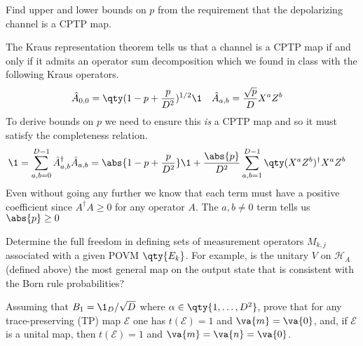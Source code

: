 \documentclass[
	pages,
	boxes,
	color=RoyalPurple
]{homework}
\makeatletter
\numberwithin{tcb@cnt@prob}{section}
\makeatother
\begin{document}
\begin{problem}
Find upper and lower bounds on $p$ from the requirement that the depolarizing channel is a CPTP map.
\end{problem}

\begin{solution}
    The Kraus representation theorem tells us that a channel is a CPTP map if and only if it admits an operator sum decomposition which we found in class with the following Kraus operators.
    \begin{align*}
        \hat{A}_{0,0} & = \qty(1 - p + \frac{p}{D^2})^{1/2}\1 & \hat{A}_{a,b} & = \frac{\sqrt{p}}{D}X^a Z^b
    \end{align*}
    To derive bounds on $p$ we need to ensure this \emph{is} a CPTP map and so it must satisfy the completeness relation.
    \begin{align*}
        \1  = \sum_{a, b = 0}^{D-1}\hat{A}_{a,b}^\dagger\hat{A}_{a,b} & = \abs{1 - p + \frac{p  }{D^2}} \1 + \frac{\abs{p}}{D^2}\sum_{a, b = 1}^{D-1}\qty(X^a Z^b)^\dagger X^a Z^b %
    \end{align*}
    Even without going any further we know that each term must have a positive coefficient since $A^\dagger A \geq 0$ for any operator $A$. The $a, b \neq 0$ term tells us $\abs{p} \geq 0$

\end{solution}

\setcounter{section}{12}
\begin{problem}
Determine the full freedom in defining sets of measurement operators $M_{k,j}$ associated with a given POVM $\qty{E_k}$. For example, is the unitary $V$ on $\mathcal{H}_A$ (defined above) the most general map on the output state that is consistent with the Born rule probabilities?
\end{problem}

\begin{solution}
\end{solution}

\setcounter{section}{15}
\begin{problem}
Assuming that $B_1 = \1_D / \sqrt{D}$ where $\alpha\in\qty{1,\ldots,D^2}$, prove that for any trace-preserving (TP) map $\mathcal{E}$ one has $t(\mathcal{E}) = 1$ and $\va{m} = \va{0}$, and, if $\mathcal{E}$ is a unital map, then $t(\mathcal{E}) = 1$ and $\va{m} = \va{n} = \va{0}$.
\end{problem}
\end{document}
